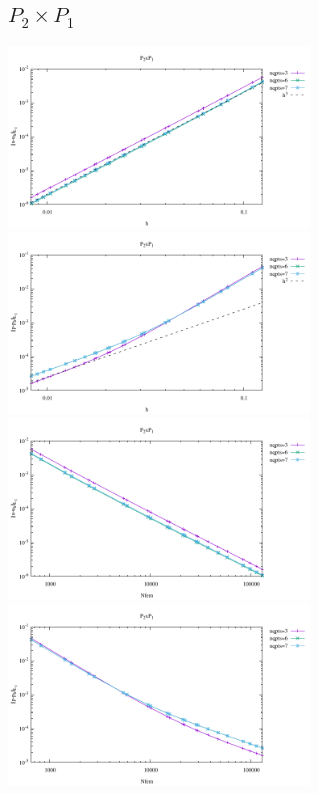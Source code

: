 \subsection*{$P_2\times P_1$}
\begin{center}
\includegraphics[width=8cm]{python_codes/fieldstone_120/results/P2P1-velocity-h.pdf}
\includegraphics[width=8cm]{python_codes/fieldstone_120/results/P2P1-pressure-h.pdf}
\includegraphics[width=8cm]{python_codes/fieldstone_120/results/P2P1-velocity-Nfem.pdf}
\includegraphics[width=8cm]{python_codes/fieldstone_120/results/P2P1-pressure-Nfem.pdf}
\end{center}

